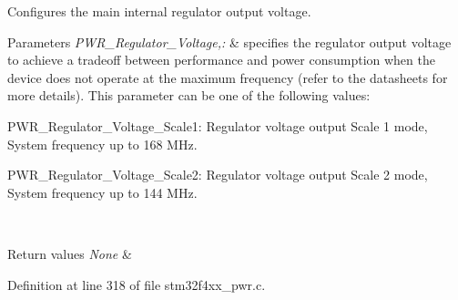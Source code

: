 Configures the main internal regulator output voltage. 


\begin{DoxyParams}{Parameters}
{\em P\-W\-R\-\_\-\-Regulator\-\_\-\-Voltage,\-:} & specifies the regulator output voltage to achieve a tradeoff between performance and power consumption when the device does not operate at the maximum frequency (refer to the datasheets for more details). This parameter can be one of the following values\-: \begin{DoxyItemize}
\item P\-W\-R\-\_\-\-Regulator\-\_\-\-Voltage\-\_\-\-Scale1\-: Regulator voltage output Scale 1 mode, System frequency up to 168 M\-Hz. \item P\-W\-R\-\_\-\-Regulator\-\_\-\-Voltage\-\_\-\-Scale2\-: Regulator voltage output Scale 2 mode, System frequency up to 144 M\-Hz. \end{DoxyItemize}
\\
\hline
\end{DoxyParams}

\begin{DoxyRetVals}{Return values}
{\em None} & \\
\hline
\end{DoxyRetVals}


Definition at line 318 of file stm32f4xx\-\_\-pwr.\-c.

